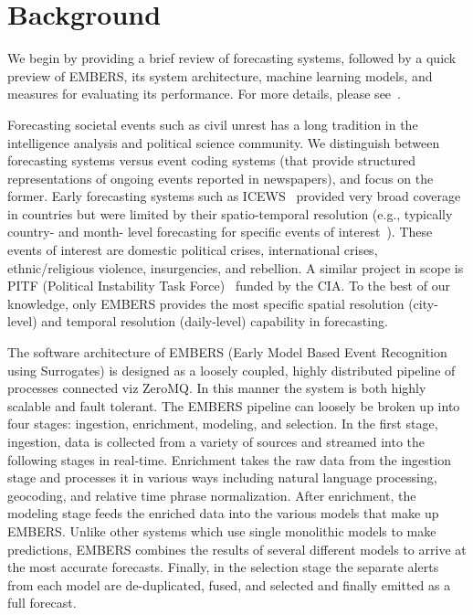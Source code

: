 \section{Background}
We begin by providing a brief review of forecasting systems, followed by a
quick preview of EMBERS, its system architecture, machine learning models,
and measures for evaluating its performance. For more details, please
see~\cite{kdd:beating-the-news}.

Forecasting societal events such as civil unrest has a long tradition in the intelligence analysis and political science
community. We distinguish between forecasting systems versus event coding systems (that provide
structured representations of ongoing events reported in newspapers), and focus on the former.
Early forecasting systems such as ICEWS~\cite{icews} provided very broad coverage in countries but
were limited by their spatio-temporal resolution (e.g., typically country- and month- level forecasting for
specific events of interest~\cite{eoiprediction}). These events of interest are
domestic political crises, international crises, ethnic/religious violence, insurgencies,
and rebellion.
A similar project in scope is PITF (Political Instability
Task Force)~\cite{pitf} funded by the CIA.
To the best of our knowledge, only EMBERS provides
the most specific spatial resolution (city-level) and temporal resolution (daily-level) capability in forecasting.

The software architecture of EMBERS (Early Model Based Event Recognition using
Surrogates) is designed as a loosely coupled, highly distributed pipeline of
processes connected viz ZeroMQ.  In this manner the system is both highly scalable and fault
tolerant.  The EMBERS pipeline can loosely be broken up into four stages:
ingestion, enrichment, modeling, and selection.  In the first stage, ingestion,
data is collected from a variety of sources and streamed into the following
stages in real-time.  Enrichment takes the raw data from the ingestion stage
and processes it in various ways including natural language processing,
geocoding, and relative time phrase normalization.  After enrichment, the
modeling stage feeds the enriched data into the various models that make up
EMBERS.  Unlike other systems which use single monolithic models to make
predictions, EMBERS combines the results of several different models to arrive
at the most accurate forecasts.  Finally, in the selection stage the separate
alerts from each model are de-duplicated, fused, and selected and finally
emitted as a full forecast.

